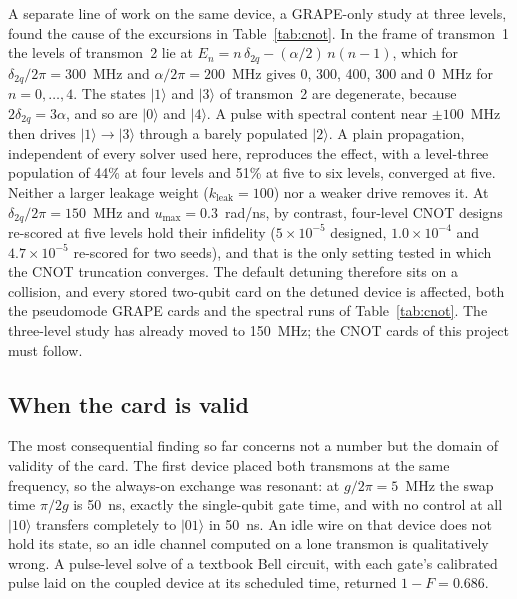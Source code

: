 \documentclass[10pt]{article}
\begin{document}
A separate line of work on the same device, a GRAPE-only study at three
levels, found the cause of the excursions in Table~\ref{tab:cnot}. In the frame
of transmon~1 the levels of transmon~2 lie at
$E_n = n\,\delta_{2q} - (\alpha/2)\, n(n-1)$, which for
$\delta_{2q}/2\pi = 300$~MHz and $\alpha/2\pi = 200$~MHz gives 0, 300, 400,
300 and 0~MHz for $n = 0,\dots,4$. The states $|1\rangle$ and $|3\rangle$ of
transmon~2 are degenerate, because $2\delta_{2q} = 3\alpha$, and so are
$|0\rangle$ and $|4\rangle$. A pulse with spectral content near $\pm 100$~MHz
then drives $|1\rangle \to |3\rangle$ through a barely populated $|2\rangle$.
A plain propagation, independent of every solver used here, reproduces the
effect, with a level-three population of 44\% at four levels and 51\% at five
to six levels, converged at five. Neither a larger leakage weight
($k_{\mathrm{leak}} = 100$) nor a weaker drive removes it. At
$\delta_{2q}/2\pi = 150$~MHz and $u_{\max} = 0.3$~rad/ns, by contrast,
four-level CNOT designs re-scored at five levels hold their infidelity
($5\times10^{-5}$ designed, $1.0\times10^{-4}$ and $4.7\times10^{-5}$ re-scored
for two seeds), and that is the only setting tested in which the CNOT
truncation converges. The default detuning therefore sits on a collision, and
every stored two-qubit card on the detuned device is affected, both the
pseudomode GRAPE cards and the spectral runs of Table~\ref{tab:cnot}. The
three-level study has already moved to 150~MHz; the CNOT cards of this project
must follow.

\subsection{When the card is valid}
\label{sec:validity}

The most consequential finding so far concerns not a number but the domain of
validity of the card. The first device placed both transmons at the same
frequency, so the always-on exchange was resonant: at $g/2\pi = 5$~MHz the swap
time $\pi/2g$ is 50~ns, exactly the single-qubit gate time, and with no
control at all $|10\rangle$ transfers completely to $|01\rangle$ in 50~ns. An
idle wire on that device does not hold its state, so an idle channel computed
on a lone transmon is qualitatively wrong. A pulse-level solve of a textbook
Bell circuit, with each gate's calibrated pulse laid on the coupled device at
its scheduled time, returned $1 - F = 0.686$.
\end{document}
